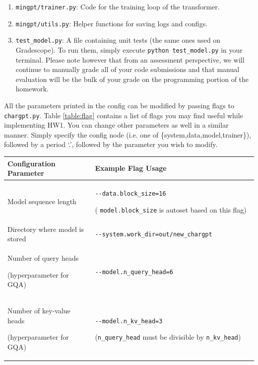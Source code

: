 \documentclass[11pt,addpoints,answers]{exam}
\begin{document}
\begin{questions}
\begin{enumerate}
    \item \lstinline{mingpt/trainer.py}: Code for the training loop of the transformer.
    
    \item \lstinline{mingpt/utils.py}: Helper functions for saving logs and configs.

    \item \lstinline{test_model.py}: A file containing unit tests (the same ones used on Gradescope). To run them, simply execute \lstinline{python test_model.py} in your terminal. Please note however that from an assessment perspective, we will continue to manually grade all of your code submissions and that manual evaluation will be the bulk of your grade on the programming portion of the homework. 
    
\end{enumerate}

All the parameters printed in the config can be modified by passing flags to \lstinline{chargpt.py}. Table \ref{table:flag} contains a list of flags you may find useful while implementing HW1. You can change other parameters as well in a similar manner. Simply specify the config node (i.e. one of \{system,data,model,trainer\}), followed by a period `.', followed by the parameter you wish to modify.

\begin{table}[h!]
\centering
\begin{tabular}{|p{0.35\linewidth}|p{0.65\linewidth}|}
\hline
Configuration Parameter & Example Flag Usage \\ \hline
Model sequence length &  \lstinline|--data.block_size=16|

( \lstinline|model.block_size| is autoset based on this flag) \\ \hline
Directory where model is stored &  \lstinline|--system.work_dir=out/new_chargpt| \\ \hline
Number of query heads 

(hyperparameter for GQA) &  \lstinline|--model.n_query_head=6| \\ \hline
Number of key-value heads 

(hyperparameter for GQA) &  \lstinline|--model.n_kv_head=3| 

(\lstinline|n_query_head| must be divisible by \lstinline|n_kv_head|) 


\end{tabular}
\end{table}
\end{questions}
\end{document}
